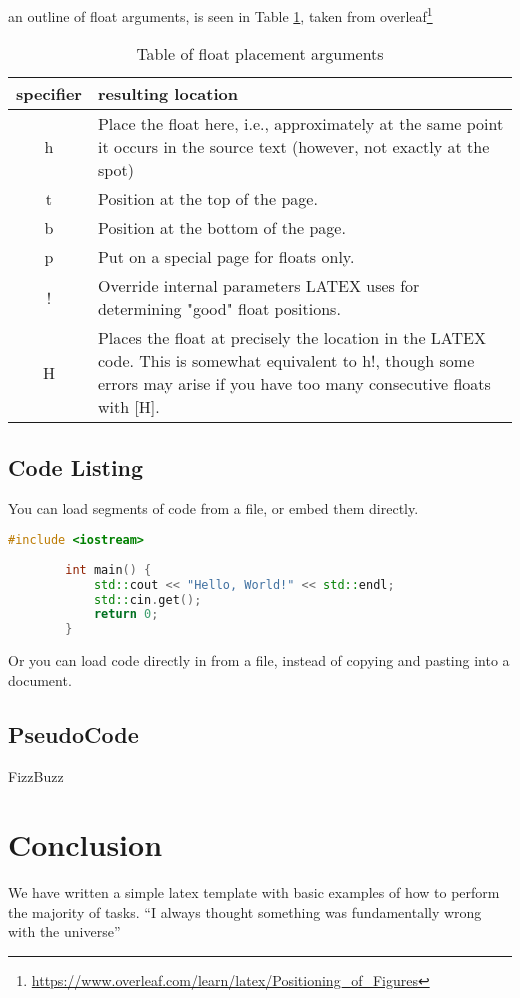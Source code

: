  an outline of float arguments, is seen in Table \ref{tbl:floatPlacement}, taken from overleaf\footnote{\url{https://www.overleaf.com/learn/latex/Positioning_of_Figures}}
	\begin{table}[h]
		\centering
		\begin{tabular}{c | p{}} 
			specifier & resulting location \\
			\hline \hline
			h	& Place the float here, i.e., approximately at the same point it occurs in the source text (however, not exactly at the spot)\\
			t	& Position at the top of the page.\\
			b	& Position at the bottom of the page.\\
			p	& Put on a special page for floats only.\\
			!	& Override internal parameters LATEX uses for determining "good" float positions.\\
			H	& Places the float at precisely the location in the LATEX code. This is somewhat equivalent to h!, though some errors may arise if you have too many consecutive floats with [H].\\
		\end{tabular}
		\caption{Table of float placement arguments}
		\label{tbl:floatPlacement}
	\end{table}


	
	
	
	
	\subsection{Code Listing}
	You can load segments of code from a file, or embed them directly.
	
	\begin{lstlisting}[caption = Hello World! in c++, language=c++]
		#include <iostream>
		
		int main() {
			std::cout << "Hello, World!" << std::endl;
			std::cin.get();
			return 0;
		}
	\end{lstlisting}

	Or you can load code directly in from a file, instead of copying and pasting into a document.
	
	
	
	\subsection{PseudoCode}
	\begin{algorithm}[h]
		\caption{FizzBuzz}
	\end{algorithm}
	
	
	
	\section{Conclusion}	
	
	We have written a simple latex template with basic examples of how to perform the majority of tasks.
	``I always thought something was fundamentally wrong with the universe'' \citep{adams1995hitchhiker}
	
	
	
	
	
